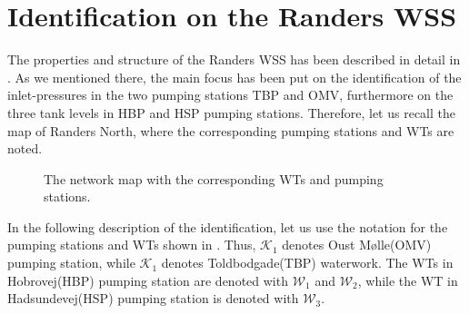 

\newpage

\section{Identification on the Randers WSS}
\label{identification_of_the_randers_WSS} 

The properties and structure of the Randers WSS has been described in detail in . As we mentioned there, the main focus has been put on the identification of the inlet-pressures in the two pumping stations TBP and OMV, furthermore on the three tank levels in HBP and HSP pumping stations. Therefore, let us recall the map of Randers North, where the corresponding pumping stations and WTs are noted.  

\begin{figure}[H]
\centering

\caption{The network map with the corresponding WTs and pumping stations.}
\label{fig:simplified_network_identification123}
\end{figure}
\vspace{-3mm}

In the following description of the identification, let us use the notation for the pumping stations and WTs shown in . Thus, $\mathcal{K}_1$ denotes Oust Mølle(OMV) pumping station, while $\mathcal{K}_1$ denotes Toldbodgade(TBP) waterwork. The WTs in Hobrovej(HBP) pumping station are denoted with $\mathcal{W}_1$ and $\mathcal{W}_2$, while the WT in Hadsundevej(HSP) pumping station is denoted with $\mathcal{W}_3$.  

